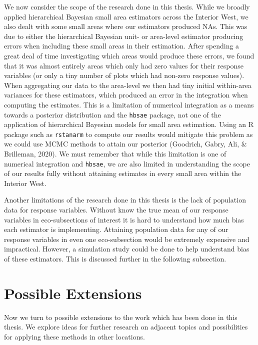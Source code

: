 \documentclass[12pt,twoside]{reedthesis}
\begin{document}
We now consider the scope of the research done in this thesis. While we broadly applied hierarchical Bayesian small area estimators across the Interior West, we also dealt with some small areas where our estimators produced NAs. This was due to either the hierarchical Bayesian unit- or area-level estimator producing errors when including these small areas in their estimation. After spending a great deal of time investigating which areas would produce these errors, we found that it was almost entirely areas which only had zero values for their response variables (or only a tiny number of plots which had non-zero response values). When aggregating our data to the area-level we then had tiny initial within-area variances for these estimators, which produced an error in the integration when computing the estimates. This is a limitation of numerical integration as a means towards a posterior distribution and the \texttt{hbsae} package, not one of the application of hierarchical Bayesian models for small area estimation. Using an R package such as \texttt{rstanarm} to compute our results would mitigate this problem as we could use MCMC methods to attain our posterior (Goodrich, Gabry, Ali, \& Brilleman, 2020). We must remember that while this limitation is one of numerical integration and \texttt{hbsae}, we are also limited in understanding the scope of our results fully without attaining estimates in every small area within the Interior West.

Another limitations of the research done in this thesis is the lack of population data for response variables. Without know the true mean of our response variables in eco-subsections of interest it is hard to understand how much bias each estimator is implementing. Attaining population data for any of our response variables in even one eco-subsection would be extremely expensive and impractical. However, a simulation study could be done to help understand bias of these estimators. This is discussed further in the following subsection.

\hypertarget{possible-extensions}{%
\section{Possible Extensions}\label{possible-extensions}}

Now we turn to possible extensions to the work which has been done in this thesis. We explore ideas for further research on adjacent topics and possibilities for applying these methods in other locations.
\end{document}
